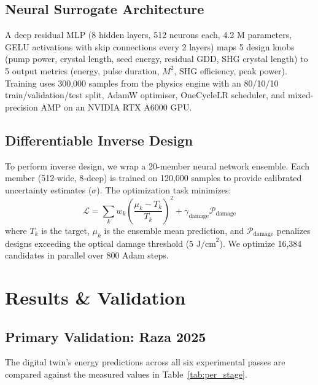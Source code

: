 \documentclass[aps,reprint,twocolumn,amsmath,amssymb,graphicx,nofootinbib]{revtex4-2}
\begin{document}
\subsection{Neural Surrogate Architecture}

A deep residual MLP (8 hidden layers, 512 neurons each, 4.2 M parameters, GELU activations with skip connections every 2 layers) maps 5 design knobs (pump power, crystal length, seed energy, residual GDD, SHG crystal length) to 5 output metrics (energy, pulse duration, $M^2$, SHG efficiency, peak power). Training uses 300,000 samples from the physics engine with an 80/10/10 train/validation/test split, AdamW optimiser, OneCycleLR scheduler, and mixed-precision AMP on an NVIDIA RTX A6000 GPU.

\subsection{Differentiable Inverse Design}

To perform inverse design, we wrap a 20-member neural network ensemble. Each member (512-wide, 8-deep) is trained on 120,000 samples to provide calibrated uncertainty estimates ($\sigma$). The optimization task minimizes:
\begin{equation}
\mathcal{L} = \sum_{k} w_k \left(\frac{\mu_k - T_k}{T_k}\right)^2 + \gamma_{\text{damage}} \mathcal{P}_{\text{damage}}
\end{equation}
where $T_k$ is the target, $\mu_k$ is the ensemble mean prediction, and $\mathcal{P}_{\text{damage}}$ penalizes designs exceeding the optical damage threshold ($5\text{ J/cm}^2$). We optimize 16,384 candidates in parallel over 800 Adam steps.

\section{Results \& Validation}

\subsection{Primary Validation: Raza 2025}

The digital twin's energy predictions across all six experimental passes are compared against the measured values in Table~\ref{tab:per_stage}.
\end{document}
